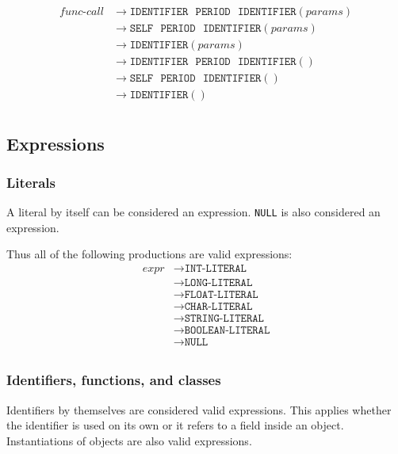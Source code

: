 \documentclass{article}
\begin{document}
\label{sec:func-call}
\begin{align*}
    \textit{func-call} &\to \texttt{IDENTIFIER} \texttt{ } \texttt{PERIOD} \texttt{ } \texttt{IDENTIFIER}(\hyperref[sec:params]{\textit{params}}) \\
    &\to \texttt{SELF} \texttt{ } \texttt{PERIOD} \texttt{ } \texttt{IDENTIFIER}(\hyperref[sec:params]{\textit{params}}) \\
    &\to \texttt{IDENTIFIER}(\hyperref[sec:params]{\textit{params}}) \\
    &\to \texttt{IDENTIFIER} \texttt{ } \texttt{PERIOD} \texttt{ } \texttt{IDENTIFIER}() \\
    &\to \texttt{SELF} \texttt{ } \texttt{PERIOD} \texttt{ } \texttt{IDENTIFIER}() \\
    &\to \texttt{IDENTIFIER}() \\
\end{align*}

\subsection{Expressions}
\label{sec:expr}
\subsubsection{Literals}
A literal by itself can be considered an expression. \texttt{NULL} is also considered an expression.

Thus all of the following productions are valid expressions:
\begin{align*}
    \textit{expr} &\to \texttt{INT-LITERAL} \\
    &\to \texttt{LONG-LITERAL} \\
    &\to \texttt{FLOAT-LITERAL} \\
    &\to \texttt{CHAR-LITERAL} \\
    &\to \texttt{STRING-LITERAL} \\
    &\to \texttt{BOOLEAN-LITERAL} \\
    &\to \texttt{NULL} \\
\end{align*}

\subsubsection{Identifiers, functions, and classes}
Identifiers by themselves are considered valid expressions. This applies whether the identifier is used on its own or it refers to a field inside an object. Instantiations of objects are also valid expressions.
\end{document}
